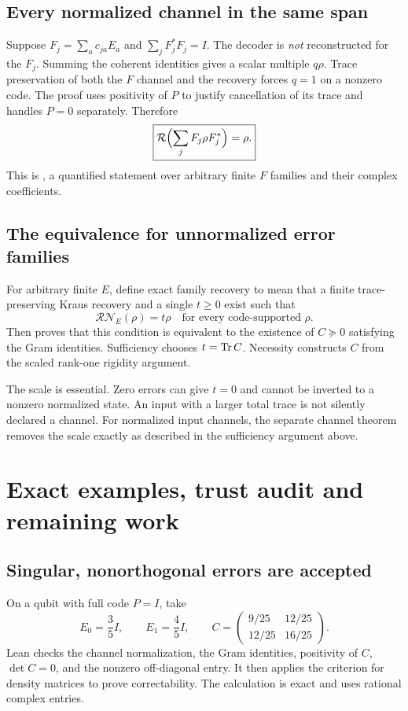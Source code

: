 \subsection{Every normalized channel in the same span}
Suppose $F_j=\sum_a c_{ja}E_a$ and $\sum_jF_j^*F_j=I$. The decoder is \emph{not} reconstructed for the $F_j$. Summing the coherent identities gives a scalar multiple $q\rho$. Trace preservation of both the $F$ channel and the recovery forces $q=1$ on a nonzero code. The proof uses positivity of $P$ to justify cancellation of its trace and handles $P=0$ separately. Therefore
\[
\boxed{\mathcal R\Bigl(\sum_jF_j\rho F_j^*\Bigr)=\rho.}
\]
This is , a quantified statement over arbitrary finite $F$ families and their complex coefficients.

\subsection{The equivalence for unnormalized error families}
For arbitrary finite $E$, define exact family recovery to mean that a finite trace-preserving Kraus recovery and a single $t\ge0$ exist such that
\[
\mathcal R\mathcal N_E(\rho)=t\rho
\quad\text{for every code-supported }\rho.
\]
Then  proves that this condition is equivalent to the existence of $C\succeq0$ satisfying the Gram identities. Sufficiency chooses $t=\operatorname{Tr} C$. Necessity constructs $C$ from the scaled rank-one rigidity argument.

The scale is essential. Zero errors can give $t=0$ and cannot be inverted to a nonzero normalized state. An input with a larger total trace is not silently declared a channel. For normalized input channels, the separate channel theorem removes the scale exactly as described in the sufficiency argument above.



\section{Exact examples, trust audit and remaining work}\label{supp5:section:006}
\subsection{Singular, nonorthogonal errors are accepted}
On a qubit with full code $P=I$, take
\[
E_0=\frac35I,\qquad E_1=\frac45I,\qquad
C=\begin{pmatrix}9/25&12/25\\12/25&16/25\end{pmatrix}.
\]
Lean checks the channel normalization, the Gram identities, positivity of $C$, $\det C=0$, and the nonzero off-diagonal entry. It then applies the criterion for density matrices to prove correctability. The calculation is exact and uses rational complex entries.

